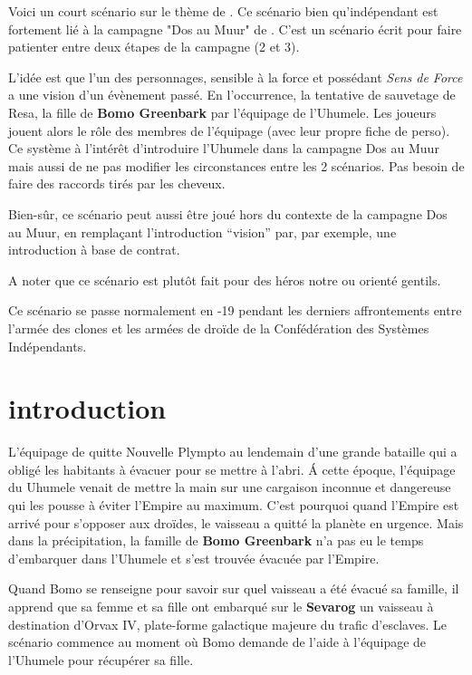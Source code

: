 \documentclass{jdrp}
\begin{document}
	Voici un court scénario sur le thème de . Ce scénario bien qu’indépendant est fortement lié à la campagne "Dos au Muur" de . C’est un scénario écrit pour faire patienter entre deux étapes de la campagne (2 et 3). 

	L’idée est que l’un des personnages, sensible à la force et possédant \textit{Sens de Force} a une vision d’un évènement passé. En l’occurrence, la tentative de sauvetage de Resa, la fille de \textbf{Bomo Greenbark} par l'équipage de l’Uhumele. Les joueurs jouent alors le rôle des membres de l’équipage (avec leur propre fiche de perso). Ce système à l’intérêt d’introduire l’Uhumele dans la campagne Dos au Muur mais aussi de ne pas modifier les circonstances entre les 2 scénarios. Pas besoin de faire des raccords tirés par les cheveux.

	Bien-sûr, ce scénario peut aussi être joué hors du contexte de la campagne Dos au Muur, en remplaçant l’introduction “vision” par, par exemple, une introduction à base de contrat.

	A noter que ce scénario est plutôt fait pour des héros notre ou orienté gentils.

	Ce scénario se passe normalement en -19 pendant les derniers affrontements entre l’armée des clones et les armées de droïde de la Confédération des Systèmes Indépendants.

	\twocolumn

	\section{introduction}
	L’équipage de  quitte Nouvelle Plympto au lendemain d’une grande bataille qui a obligé les habitants à évacuer pour se mettre à l’abri. \'A cette époque, l’équipage du Uhumele venait de mettre la main sur une cargaison inconnue et dangereuse qui les pousse à éviter l’Empire au maximum. C’est pourquoi quand l’Empire est arrivé pour s’opposer aux droïdes, le vaisseau a quitté la planète en urgence. Mais dans la précipitation, la famille de \textbf{Bomo Greenbark} n’a pas eu le temps d’embarquer dans l’Uhumele et s’est trouvée évacuée par l’Empire.

	Quand Bomo se renseigne pour savoir sur quel vaisseau a été évacué sa famille, il apprend que sa femme et sa fille ont embarqué sur le \textbf{Sevarog} un vaisseau à destination d’Orvax IV, plate-forme galactique majeure du trafic d’esclaves. Le scénario commence au moment où Bomo demande de l’aide à l’équipage de l’Uhumele pour récupérer sa fille.
\end{document}
